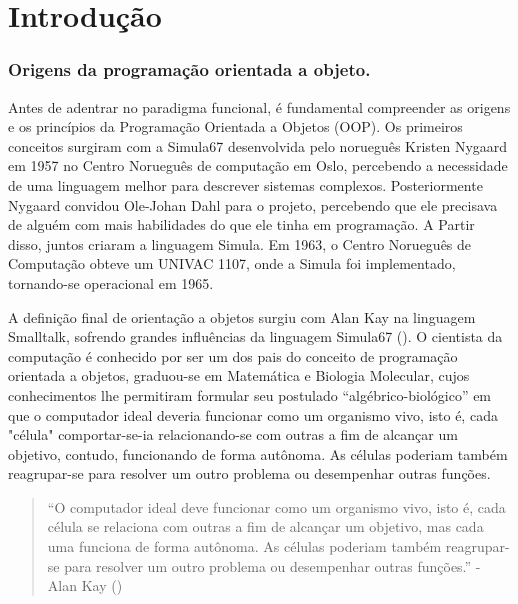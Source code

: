 \chapter{Introdução}

\subsection{Origens da programação orientada a objeto.}

Antes de adentrar no paradigma funcional, é fundamental compreender as origens e os princípios da Programação Orientada a Objetos (OOP). Os primeiros conceitos surgiram com a Simula67 desenvolvida pelo norueguês Kristen Nygaard em 1957 no Centro Norueguês de computação em Oslo, percebendo a necessidade de uma linguagem melhor para descrever sistemas complexos. Posteriormente Nygaard convidou Ole-Johan Dahl para o projeto, percebendo que ele precisava de alguém com mais habilidades do que ele tinha em programação. A Partir disso, juntos criaram a linguagem Simula. Em 1963, o Centro Norueguês de Computação obteve um UNIVAC 1107, onde a Simula foi implementado, tornando-se operacional em 1965. 


A definição final de orientação a objetos surgiu com Alan Kay na linguagem Smalltalk, sofrendo grandes influências da linguagem Simula67 (). O cientista da computação é conhecido por ser um dos pais do conceito de programação orientada a objetos, graduou-se em Matemática e Biologia Molecular, cujos conhecimentos lhe permitiram formular seu postulado “algébrico-biológico” em que o computador ideal deveria funcionar como um organismo vivo, isto é, cada "célula" comportar-se-ia relacionando-se com outras a fim de alcançar um objetivo, contudo, funcionando de forma autônoma. As células poderiam também reagrupar-se para resolver um outro problema ou desempenhar outras funções.

\begin{quote}
“O computador ideal deve funcionar como um organismo vivo, isto é, cada célula se relaciona com outras a fim de alcançar um objetivo, mas cada uma funciona de forma autônoma. As células poderiam também reagrupar-se para resolver um outro problema ou desempenhar outras funções.” - Alan Kay ()
\end{quote}

